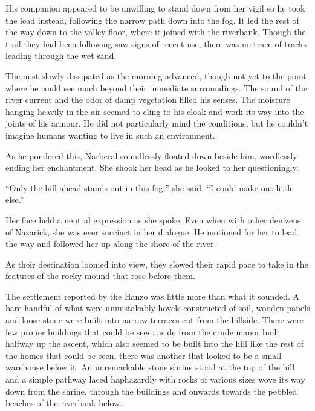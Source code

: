  

His companion appeared to be unwilling to stand down from her vigil so he took the lead instead, following the narrow path down into the fog. It led the rest of the way down to the valley floor, where it joined with the riverbank. Though the trail they had been following saw signs of recent use, there was no trace of tracks leading through the wet sand.

 

The mist slowly dissipated as the morning advanced, though not yet to the point where he could see much beyond their immediate surroundings. The sound of the river current and the odor of damp vegetation filled his senses. The moisture hanging heavily in the air seemed to cling to his cloak and work its way into the joints of his armour. He did not particularly mind the conditions, but he couldn't imagine humans wanting to live in such an environment.

 

As he pondered this, Narberal soundlessly floated down beside him, wordlessly ending her enchantment. She shook her head as he looked to her questioningly.

 

“Only the hill ahead stands out in this fog,” she said. “I could make out little else.”

 

Her face held a neutral expression as she spoke. Even when with other denizens of Nazarick, she was ever succinct in her dialogue. He motioned for her to lead the way and followed her up along the shore of the river.

 

As their destination loomed into view, they slowed their rapid pace to take in the features of the rocky mound that rose before them.

 

The settlement reported by the Hanzo was little more than what it sounded. A bare handful of what were unmistakably hovels constructed of soil, wooden panels and loose stone were built into narrow terraces cut from the hillside. There were few proper buildings that could be seen: aside from the crude manor built halfway up the ascent, which also seemed to be built into the hill like the rest of the homes that could be seen, there was another that looked to be a small warehouse below it. An unremarkable stone shrine stood at the top of the hill and a simple pathway laced haphazardly with rocks of various sizes wove its way down from the shrine, through the buildings and onwards towards the pebbled beaches of the riverbank below.

